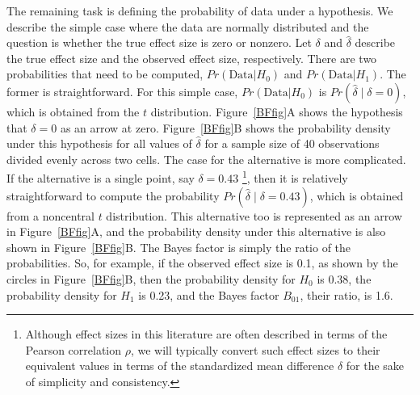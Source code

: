 \documentclass[man]{apa6}
\begin{document}
The remaining task is defining the probability of data under a hypothesis.  We describe the simple case where the data are normally distributed and the question is whether the true effect size is zero or nonzero.  Let $\delta$ and $\hat{\delta}$ describe the true effect size and the observed effect size, respectively.  There are two probabilities that need to be computed,   $Pr(\mbox{Data} | H_0)$ and $Pr(\mbox{Data} | H_1)$.   The former is straightforward.  For this simple case, $Pr(\mbox{Data} | H_0)$ is $Pr(\hat{\delta} \mid \delta=0)$, which is obtained from the $t$ distribution.  Figure~\ref{BFfig}A shows the hypothesis that $\delta=0$ as an arrow at zero.  Figure~\ref{BFfig}B shows the probability density under this hypothesis for all values of $\hat{\delta}$ for a sample size of 40 observations divided evenly across two cells. The case for the alternative is more complicated.  If the alternative is a single point, say $\delta=0.43$ \citep[here chosen as an example because $\delta = 0.43$ is the effect size of violent games on aggressive behaviors as described by][]{Anderson:etal:2010}\footnote{Although effect sizes in this literature are often described in terms of the Pearson correlation $\rho$, we will typically convert such effect sizes to their equivalent values in terms of the standardized mean difference $\delta$ for the sake of simplicity and consistency.}, then it is relatively straightforward to compute the probability $Pr(\hat{\delta} \mid \delta=0.43)$, which is obtained from a noncentral $t$ distribution.   This alternative too is represented as an arrow in Figure~\ref{BFfig}A, and the probability density under this alternative is also shown in Figure~\ref{BFfig}B. The Bayes factor is simply the ratio of the probabilities.  So, for example, if the observed effect size is 0.1, as shown by the circles in Figure~\ref{BFfig}B, then the probability density for $H_0$ is 0.38, the probability density for $H_1$ is 0.23, and the Bayes factor $B_{01}$, their ratio, is 1.6. 
\end{document}

